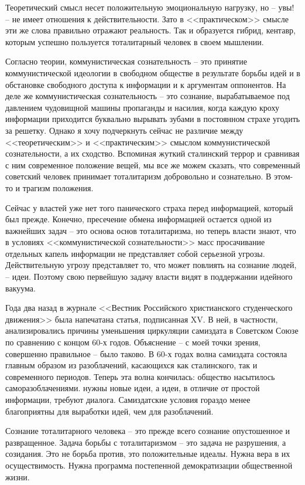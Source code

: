 \documentclass{book}
\begin{document}
Теоретиче­ский смысл несет положительную эмоциональную нагрузку, но -- увы! -- не имеет отношения к действительности. Зато в <<практическом>> смысле эти же слова правильно отражают реальность. Так и образуется гибрид, кентавр, которым успеш­но пользуется тоталитарный человек в своем мышлении.

Согласно теории, коммунистическая сознательность -- это принятие коммунистической идеологии в свободном обществе в результате борьбы идей и в обстановке свободного доступа к информации и к аргументам оппонентов. На деле же коммунистическая сознательность -- это сознание, вырабатываемое под давлением чудовищной машины пропаганды и насилия, когда каждую кроху информации приходится буквально вырывать зубами в постоянном страхе угодить за решетку. Однако я хочу подчеркнуть сейчас не различие между <<теоретическим>> и <<практическим>> смыслом коммунистической сознательности, а их сходство. Вспоминая жуткий сталинский террор и сравни­вая с ним современное положение вещей, мы все же можем сказать, что современный советский человек принимает тоталитаризм добровольно и сознательно. В этом-то и трагизм положения.

Сейчас у властей уже нет того панического страха перед информацией, который был прежде. Конечно, пресечение обме­на информацией остается одной из важнейших задач -- это основа основ тоталитаризма, но теперь власти знают, что в условиях <<коммунистической сознательности>> масс просачивание отдельных капель информации не представляет собой серьезной угрозы. Действительную угрозу представляет то, что может повлиять на сознание людей, -- идеи. Поэтому свою первейшую задачу власти видят в поддержании идейного вакуума.

Года два назад в журнале <<Вестник Российского христианского студенческого движения>> была напечатана статья, подписанная XV. В ней, в частности, анализировались причины уменьшения циркуляции самиздата в Советском Союзе по сравнению с концом 60-х годов. Объяснение -- с моей точки зрения, совершенно правильное -- было таково. В 60-х годах волна самиздата состояла главным образом из разоблачений,  касающихся как сталинского, так и современного периодов. Теперь эта волна кончилась: общество насытилось саморазоблачениями. нужны новые идеи, а идеи, в отличие от простой информации, требуют диалога. Самиздатские условия гораздо менее благоприятны для выработки идей, чем для разоблачений.

Сознание тоталитарного человека -- это прежде всего сознание опустошенное и развращенное. Задача борьбы с тоталитаризмом -- это задача не разрушения, а созидания. Это не борьба против,  это положительные идеалы. Нужна вера в их осуществимость. Нужна программа постепенной демократизации общественной жизни.
\end{document}
